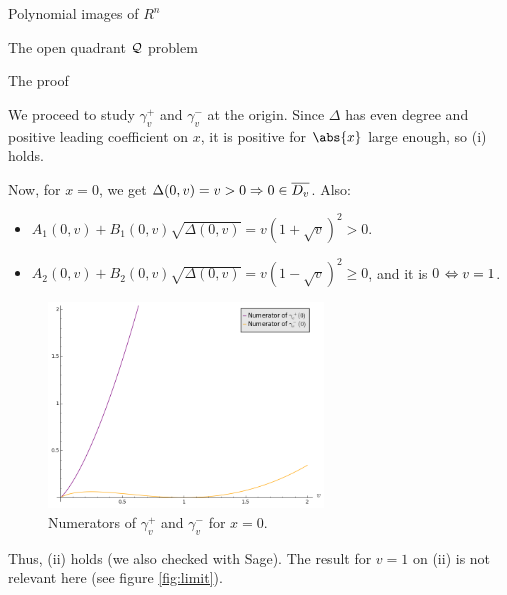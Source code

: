 \documentclass[11pt, a4paper, english, twoside, notitlepage]{report}
\begin{document}
\begin{chapter}{Polynomial images of $R^n$}
\begin{section}{The open quadrant $\mathcal{Q}$ problem}
\begin{subsection}{The proof}
\begin{Proof}
			We proceed to study $\gamma_v^+$ and $\gamma_v^-$ at the origin. Since $\Delta$ has even degree and positive leading coefficient on $x$, it is positive for $\abs{x}$ large enough, so (i) holds.
			
			Now, for $x = 0$, we get $\Delta(0, v) = v > 0 \Rightarrow 0 \in \overline{D_v}$. Also:
			\begin{itemize}
				\item $A_1(0,v) + B_1(0,v) \sqrt{\Delta(0,v)} = v(1+\sqrt{v})^2 > 0$.
				
				\item $A_2(0,v) + B_2(0,v) \sqrt{\Delta(0,v)} = v(1-\sqrt{v})^2 \geq 0$, and it is $0$ $\Leftrightarrow v = 1$.
			\end{itemize}
			
			\begin{figure}[h]
				\centering
				\includegraphics[width=0.65\textwidth]{plots/ch1_08_numerators.png}
				\caption{Numerators of $\gamma_v^+$ and $\gamma_v^-$ for $x = 0$.\label{fig:numerators}}
			\end{figure}
			
			Thus, (ii) holds (we also checked with Sage). The result for $v = 1$ on (ii) is not relevant here (see figure \ref{fig:limit}).
			

\end{Proof}
\end{subsection}
\end{section}
\end{chapter}
\end{document}
